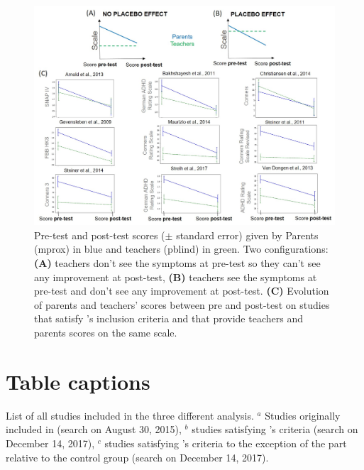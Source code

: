 \documentclass[12pt,a4paper,english]{article}
\begin{document}
\begin{figure}[h!]
  \centering
  \includegraphics[width=1.0\linewidth]{figures/discussion_on_placebo_effect_colors_2-columns_fitting_image}
  \caption{Pre-test and post-test scores ($\pm$ standard error) given by Parents (\gls{mprox}) in blue and teachers (\gls{pblind}) in green. Two configurations: \textbf{(A)} teachers don’t see the symptoms at 
	pre-test so they can’t see any improvement at post-test, \textbf{(B)} teachers see the symptoms at pre-test and don’t see any improvement at post-test. \textbf{(C)} Evolution of parents and teachers' scores
	between pre and post-test on studies that satisfy \citeauthor{Cortese2016}'s inclusion criteria and that provide teachers and parents scores on the same scale.}
  \label{Figure:discussion_on_placebo_effect_colors_2-columns_fitting_image}
\end{figure} 

\clearpage

\section*{Table captions}

\begin{table}[h!]
  \centering
  \caption{List of all studies included in the three different analysis. $^a$ Studies originally included in \citet{Cortese2016}
	(search on August 30, 2015), $^b$ studies satisfying \citet{Cortese2016}'s criteria (search on December 14, 2017), $^c$ studies 
	satisfying \citet{Cortese2016}'s criteria to the exception of the part relative to the control group (search on December 14, 2017).}
  
  \label{Table:table_factors_analysis_meta_analysis_list_studies}
\end{table}
\end{document}

